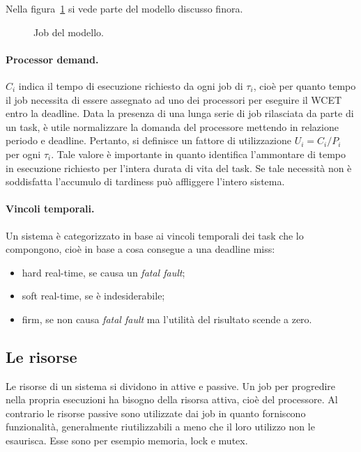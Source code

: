 Nella figura~\ref{fig:model_job} si vede parte del modello discusso finora.

\begin{figure}
\centering
\model
\caption{Job del modello.}
\label{fig:model_job}
\end{figure}

\paragraph{Processor demand.} $C_i$ indica il tempo di esecuzione richiesto da ogni job di $\tau_i$, cioè per quanto tempo il job necessita di essere assegnato ad uno dei processori per eseguire il WCET entro la deadline. Data la presenza di una lunga serie di job rilasciata da parte di un task, è utile normalizzare la domanda del processore mettendo in relazione periodo e deadline. Pertanto, si definisce un fattore di utilizzazione $U_i = C_i / P_i$ per ogni $\tau_i$. Tale valore è importante in quanto identifica l'ammontare di tempo in esecuzione richiesto per l'intera durata di vita del task. Se tale necessità non è soddisfatta l'accumulo di tardiness può affliggere l'intero sistema.

\paragraph{Vincoli temporali.} Un sistema è categorizzato in base ai vincoli temporali dei task che lo compongono, cioè in base a cosa consegue a una deadline miss:

\begin{itemize}
	\item hard real-time, se causa un \textit{fatal fault};
	\item soft real-time, se è indesiderabile;
	\item firm, se non causa \textit{fatal fault} ma l'utilità del risultato scende a zero.
\end{itemize}

\subsection{Le risorse}
\label{sec:overviewRM}

Le risorse di un sistema si dividono in attive e passive. Un job per progredire nella propria esecuzioni ha bisogno della risorsa attiva, cioè del processore. Al contrario le risorse passive sono utilizzate dai job in quanto forniscono funzionalità, generalmente riutilizzabili a meno che il loro utilizzo non le esaurisca. Esse sono per esempio memoria, lock e mutex.\\

